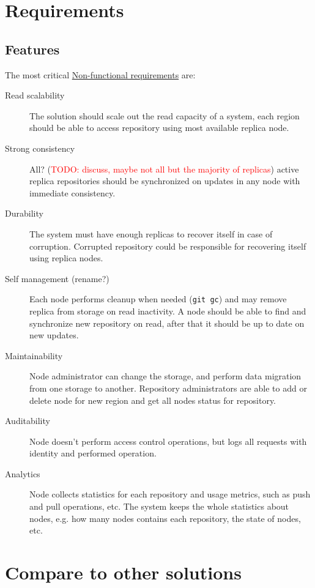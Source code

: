 \documentclass[acmlarge, screen, nonacm]{acmart}
\newcommand{\code}[1]{\texttt{#1}}
\newcommand{\todo}[1]{\textcolor{red}{TODO: #1}}
\begin{document}
\section{Requirements}
\label{sec:requirements}

\subsection{Features}
\label{sec:features}

The most critical
\href{https://en.wikipedia.org/wiki/Non-functional_requirement}{Non-functional requirements}
are:

\begin{description}
  \item[Read scalability]
    The solution should scale out the read capacity of a system, each region should be able
    to access repository using most available replica node.
  \item[Strong consistency]
    All? (\todo{discuss, maybe not all but the majority of replicas})
    active replica repositories should be synchronized on updates in any node
    with immediate consistency.
  \item[Durability]
    The system must have enough replicas to recover itself in case of corruption.
    Corrupted repository could be responsible for recovering itself using replica nodes.
  \item[Self management (rename?)]
    Each node performs cleanup when needed (\code{git gc}) and may remove replica
    from storage on read inactivity.
    A node should be able to find and synchronize new repository on read,
    after that it should be up to date on new updates.
  \item[Maintainability]
    Node administrator can change the storage, and perform data migration from one storage
    to another.
    Repository administrators are able to add or delete node for new region and
    get all nodes status for repository.
  \item[Auditability]
    Node doesn't perform access control operations, but logs all
    requests with identity and performed operation.
  \item[Analytics]
    Node collects statistics for each repository and usage metrics, such as
    push and pull operations, etc. The system keeps the whole statistics about
    nodes, e.g. how many nodes contains each repository, the state of nodes, etc.
\end{description}

\section{Compare to other solutions}
\end{document}
